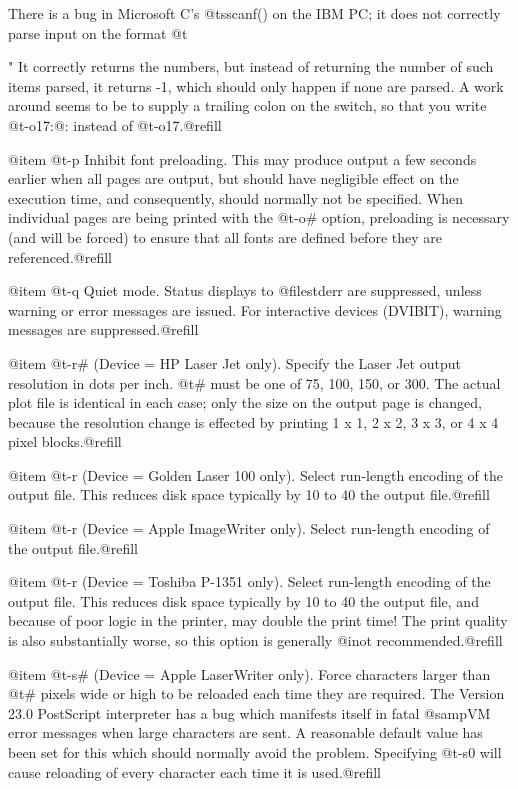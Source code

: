 There is a bug in Microsoft C's @t{sscanf()} on the IBM PC;
it does not correctly parse input on the format
@t{"%
It correctly returns the numbers, but instead of returning
the number of such items parsed, it returns -1, which should
only happen if none are parsed.  A work around seems to be to
supply a trailing colon on the switch, so that you write
@t{-o17:}@: instead of @t{-o17}.@refill

@item @t{-p}
Inhibit font preloading.  This may produce output a few
seconds earlier when all pages are output, but should have
negligible effect on the execution time, and consequently,
should normally not be specified.  When individual pages are
being printed with the @t{-o#} option, preloading is
necessary (and will be forced) to ensure that all fonts are
defined before they are referenced.@refill

@item @t{-q}
Quiet mode.  Status displays to @file{stderr} are suppressed,
unless warning or error messages are issued.  For interactive
devices (DVIBIT), warning messages are suppressed.@refill

@item @t{-r#}
(Device = HP Laser Jet only).  Specify the Laser Jet output
resolution in dots per inch.  @t{#} must be one of 75, 100,
150, or 300.  The actual plot file is identical in each case;
only the size on the output page is changed, because the
resolution change is effected by printing 1 x 1, 2 x 2, 3 x
3, or 4 x 4 pixel blocks.@refill

@item @t{-r}
(Device = Golden Laser 100 only).  Select run-length encoding
of the output file.  This reduces disk space typically by 10%
to 40%
the output file.@refill

@item @t{-r}
(Device = Apple ImageWriter only).  Select run-length
encoding of the output file.@refill

@item @t{-r}
(Device = Toshiba P-1351 only).  Select run-length encoding
of the output file.  This reduces disk space typically by 10%
to 40%
the output file, and because of poor logic in the printer,
may double the print time!  The print quality is also
substantially worse, so this option is generally @i{not}
recommended.@refill

@item @t{-s#}
(Device = Apple LaserWriter only).  Force characters larger
than @t{#} pixels wide or high to be reloaded each time they
are required.  The Version 23.0 PostScript interpreter has
a bug which manifests itself in fatal @samp{VM error}
messages when large characters are sent.  A reasonable
default value has been set for this which should normally
avoid the problem.  Specifying @t{-s0} will cause reloading
of every character each time it is used.@refill

}
